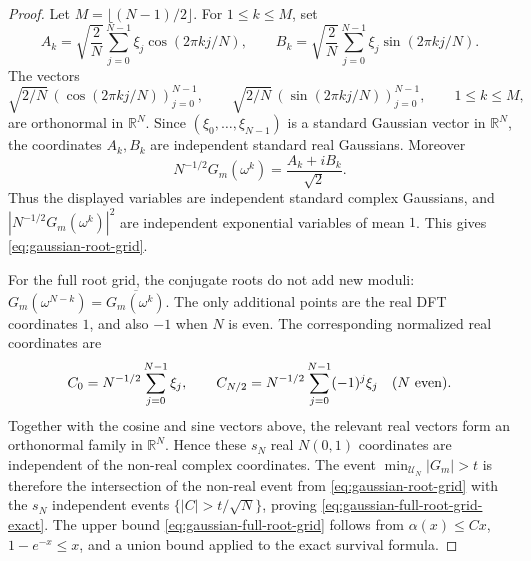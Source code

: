 \documentclass[11pt]{amsart}
\numberwithin{equation}{section}
\theoremstyle{definition}
\theoremstyle{remark}
\newcommand{\R}{\mathbb R}
\newcommand{\abs}[1]{\left\lvert #1\right\rvert}
\begin{document}
\begin{proof}
Let \(M=\lfloor(N-1)/2\rfloor\).  For \(1\le k\le M\), set
\[
  A_k=\sqrt{\frac2N}\sum_{j=0}^{N-1}\xi_j\cos(2\pi kj/N),
  \qquad
  B_k=\sqrt{\frac2N}\sum_{j=0}^{N-1}\xi_j\sin(2\pi kj/N).
\]
The vectors
\[
  \sqrt{2/N}\,(\cos(2\pi kj/N))_{j=0}^{N-1},\qquad
  \sqrt{2/N}\,(\sin(2\pi kj/N))_{j=0}^{N-1},
  \qquad 1\le k\le M,
\]
are orthonormal in \(\R^N\).  Since \((\xi_0,\dots,\xi_{N-1})\) is a standard
Gaussian vector in \(\R^N\), the coordinates \(A_k,B_k\) are independent
standard real Gaussians.  Moreover
\[
  N^{-1/2}G_m(\omega^k)=\frac{A_k+iB_k}{\sqrt2}.
\]
Thus the displayed variables are independent standard complex Gaussians, and
\(\abs{N^{-1/2}G_m(\omega^k)}^2\) are independent exponential variables of
mean \(1\).  This gives \eqref{eq:gaussian-root-grid}.

For the full root grid, the conjugate roots do not add new moduli:
\(G_m(\omega^{N-k})=\overline{G_m(\omega^k)}\).  The only additional points are
the real DFT coordinates \(1\), and also \(-1\) when \(N\) is even.  The
corresponding normalized real coordinates are
\[
  C_0=N^{-1/2}\sum_{j=0}^{N-1}\xi_j,\qquad
  C_{N/2}=N^{-1/2}\sum_{j=0}^{N-1}(-1)^j\xi_j\quad(N\ {\rm even}).
\]
Together with the cosine and sine vectors above, the relevant real vectors form
an orthonormal family in \(\R^N\).  Hence these \(s_N\) real \(N(0,1)\)
coordinates are independent of the non-real complex coordinates.  The event
\(\min_{\mathcal U_N}\abs{G_m}>t\) is therefore the intersection of the
non-real event from \eqref{eq:gaussian-root-grid} with the \(s_N\) independent
events \(\{|C|>t/\sqrt N\}\), proving
\eqref{eq:gaussian-full-root-grid-exact}.  The upper bound
\eqref{eq:gaussian-full-root-grid} follows from
\(\alpha(x)\le Cx\), \(1-e^{-x}\le x\), and a union bound applied to the exact
survival formula.
\end{proof}
\end{document}
